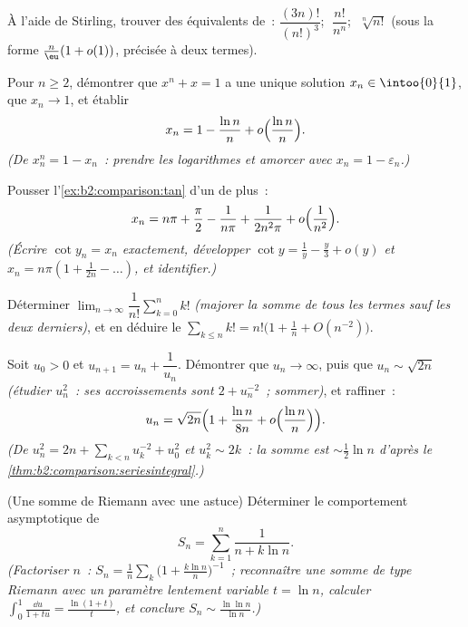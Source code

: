 \begin{exercise}[$\star\star$]\label{exo:b2:comparison:4}
À l'aide de Stirling, trouver des équivalents de~: $\dfrac{(3n)!}{(n!)^3}$;
$\;\dfrac{n!}{n^n}$; $\;\sqrt[n]{n!}$ (sous la forme $\frac n\eu(1 + o(1))$,
précisée à deux termes).
\end{exercise}

\begin{exercise}[$\star\star$]\label{exo:b2:comparison:5}
Pour $n \geq 2$, démontrer que $x^n + x = 1$ a une unique solution $x_n
\in \intoo{0}{1}$, que $x_n \to 1$, et établir
\[
x_n = 1 - \frac{\ln n}{n} + o\Bigl(\frac{\ln n}{n}\Bigr).
\]
\emph{(De $x_n^n = 1 - x_n$~: prendre les logarithmes et amorcer avec
$x_n = 1 - \varepsilon_n$.)}
\end{exercise}

\begin{exercise}[$\star\star$]\label{exo:b2:comparison:6}
Pousser l'\cref{ex:b2:comparison:tan} d'un  de plus~:
\[
x_n = n\pi + \frac\pi2 - \frac{1}{n\pi} + \frac{1}{2n^2\pi} +
o\Bigl(\frac{1}{n^2}\Bigr).
\]
\emph{(Écrire $\cot y_n = x_n$ exactement, développer $\cot y = \frac1y -
\frac y3 + o(y)$ et $x_n = n\pi(1 + \frac{1}{2n} - \dots)$, et
identifier.)}
\end{exercise}

\begin{exercise}[$\star\star$]\label{exo:b2:comparison:7}
Déterminer $\lim_{n\to\infty} \dfrac{1}{n!}\sum_{k=0}^{n} k!$
\emph{(majorer la somme de tous les termes sauf les deux derniers)}, et
en déduire le  $\sum_{k \leq n} k! = n!\bigl(1 + \frac1n +
O(n^{-2})\bigr)$.
\end{exercise}

\begin{exercise}[$\star\star\star$]\label{exo:b2:comparison:8}
Soit $u_0 > 0$ et $u_{n+1} = u_n + \dfrac{1}{u_n}$. Démontrer que $u_n
\to \infty$, puis que $u_n \sim \sqrt{2n}$ \emph{(étudier $u_n^2$~:
ses accroissements sont $2 + u_n^{-2}$~; sommer)}, et raffiner~:
\[
u_n = \sqrt{2n}\Bigl(1 + \frac{\ln n}{8n} +
o\Bigl(\frac{\ln n}{n}\Bigr)\Bigr).
\]
\emph{(De $u_n^2 = 2n + \sum_{k<n} u_k^{-2} + u_0^2$ et $u_k^2
\sim 2k$~: la somme est $\sim \frac12\ln n$ d'après le~%
\cref{thm:b2:comparison:seriesintegral}.)}
\end{exercise}

\begin{exercise}[$\star\star\star$]\label{exo:b2:comparison:9}
(Une somme de Riemann avec une astuce) Déterminer le comportement
asymptotique de
\[
S_n = \sum_{k=1}^{n} \frac{1}{n + k\ln n} .
\]
\emph{(Factoriser $n$~: $S_n = \frac1n\sum_k \bigl(1 +
\frac{k\ln n}{n}\bigr)^{-1}$~; reconnaître une somme de type Riemann
avec un paramètre lentement variable $t = \ln n$, calculer $\int_0^1
\frac{\dd u}{1 + tu} = \frac{\ln(1+t)}{t}$, et conclure $S_n \sim
\frac{\ln\ln n}{\ln n}$.)}
\end{exercise}

